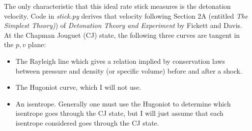 \documentclass[11pt]{article}
\begin{document}
The only characteristic that this ideal rate stick measures is the
detonation velocity.  Code in \emph{stick.py} derives that velocity
following Section 2A (entitled \emph{The Simplest Theory)}) of
\emph{Detonation Theory and Experiment} by Fickett and
Davis\cite{FickettDavis}.  At the Chapman Jouguet (CJ) state, the
following three curves are tangent in the $p,v$ plane:
\begin{itemize}
\item The Rayleigh line which gives a relation implied by conservation
  laws between pressure and density (or specific volume) before and
  after a shock.
\item The Hugoniot curve, which I will not use.
\item An isentrope.  Generally one must use the Hugoniot to determine
  which isentrope goes through the CJ state, but I will just assume
  that each isentrope considered goes through the CJ state.
\end{itemize}
\end{document}
